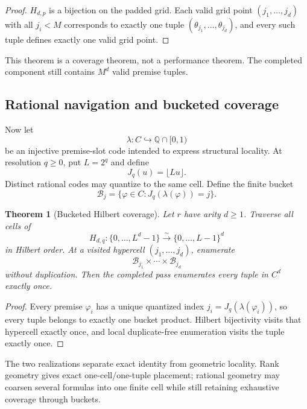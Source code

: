\documentclass[11pt]{article}
\newtheorem{theorem}{Theorem}[section]
\theoremstyle{definition}
\newcommand{\Q}{\mathbb Q}
\begin{document}
\begin{proof}
$H_{d,p}$ is a bijection on the padded grid. Each valid grid point $(j_1,\ldots,j_d)$ with all $j_i<M$ corresponds to exactly one tuple $(\theta_{j_1},\ldots,\theta_{j_d})$, and every such tuple defines exactly one valid grid point.
\end{proof}

This theorem is a coverage theorem, not a performance theorem. The completed component still contains $M^d$ valid premise tuples.

\subsection{Rational navigation and bucketed coverage}

Now let
\[
\lambda:C\hookrightarrow \Q\cap[0,1)
\]
be an injective premise-slot code intended to express structural locality. At resolution $q\ge 0$, put $L=2^q$ and define
\[
J_q(u)=\lfloor Lu\rfloor.
\]
Distinct rational codes may quantize to the same cell. Define the finite bucket
\[
\mathcal B_j=\{\varphi\in C:J_q(\lambda(\varphi))=j\}.
\]

\begin{theorem}[Bucketed Hilbert coverage]\label{thm:bucket}
Let $r$ have arity $d\ge 1$. Traverse all cells of
\[
H_{d,q}:\{0,\ldots,L^d-1\}\overset{\sim}{\longrightarrow}\{0,\ldots,L-1\}^d
\]
in Hilbert order. At a visited hypercell $(j_1,\ldots,j_d)$, enumerate
\[
\mathcal B_{j_1}\times\cdots\times\mathcal B_{j_d}
\]
without duplication. Then the completed pass enumerates every tuple in $C^d$ exactly once.
\end{theorem}

\begin{proof}
Every premise $\varphi_i$ has a unique quantized index $j_i=J_q(\lambda(\varphi_i))$, so every tuple belongs to exactly one bucket product. Hilbert bijectivity visits that hypercell exactly once, and local duplicate-free enumeration visits the tuple exactly once.
\end{proof}

The two realizations separate exact identity from geometric locality. Rank geometry gives exact one-cell/one-tuple placement; rational geometry may coarsen several formulas into one finite cell while still retaining exhaustive coverage through buckets.
\end{document}
